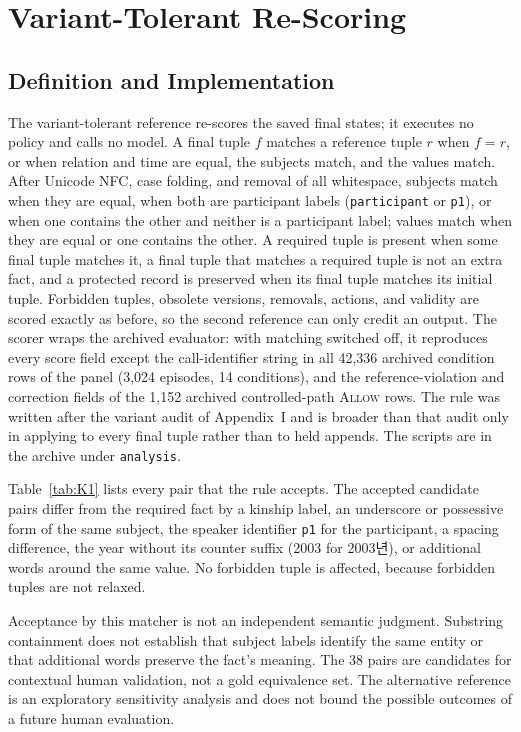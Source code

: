\documentclass[acmsmall,review]{acmart}
\newcommand{\allow}{\textsc{Allow}}
\begin{document}
\section{Variant-Tolerant Re-Scoring}
\subsection{Definition and Implementation}
The variant-tolerant reference re-scores the saved final states; it executes no policy and calls no model. A final tuple $f$ matches a reference tuple $r$ when $f=r$, or when relation and time are equal, the subjects match, and the values match. After Unicode NFC, case folding, and removal of all whitespace, subjects match when they are equal, when both are participant labels (\texttt{participant} or \texttt{p1}), or when one contains the other and neither is a participant label; values match when they are equal or one contains the other. A required tuple is present when some final tuple matches it, a final tuple that matches a required tuple is not an extra fact, and a protected record is preserved when its final tuple matches its initial tuple. Forbidden tuples, obsolete versions, removals, actions, and validity are scored exactly as before, so the second reference can only credit an output. The scorer wraps the archived evaluator: with matching switched off, it reproduces every score field except the call-identifier string in all 42,336 archived condition rows of the panel (3,024 episodes, 14 conditions), and the reference-violation and correction fields of the 1,152 archived controlled-path \allow{} rows. The rule was written after the variant audit of Appendix~I and is broader than that audit only in applying to every final tuple rather than to held appends. The scripts are in the archive under \texttt{analysis}.

Table~\ref{tab:K1} lists every pair that the rule accepts. The accepted candidate pairs differ from the required fact by a kinship label, an underscore or possessive form of the same subject, the speaker identifier \texttt{p1} for the participant, a spacing difference, the year without its counter suffix (2003 for 2003년), or additional words around the same value. No forbidden tuple is affected, because forbidden tuples are not relaxed.

Acceptance by this matcher is not an independent semantic judgment. Substring containment does not establish that subject labels identify the same entity or that additional words preserve the fact's meaning. The 38 pairs are candidates for contextual human validation, not a gold equivalence set. The alternative reference is an exploratory sensitivity analysis and does not bound the possible outcomes of a future human evaluation.
\end{document}
